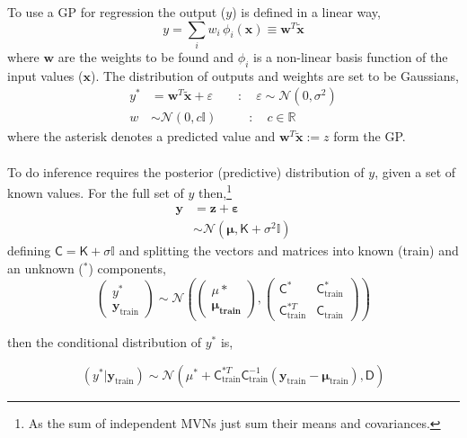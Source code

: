 \documentclass[a4paper,10.5pt]{article}
\begin{document}
To use a GP for regression the output ($y$) is defined in a linear way,
\begin{equation}
	y = \sum_i w_i \,\phi_i(\boldsymbol{x}) \equiv \boldsymbol{w}^T\tilde{\boldsymbol{x}}
\end{equation}
where $\boldsymbol{w}$ are the weights to be found and $\phi_i$ is a non-linear basis function of the input values ($\boldsymbol{x}$). The distribution of outputs and weights are set to be Gaussians,
\begin{equation}
	\begin{aligned}
		y^* &= \boldsymbol{w}^T\tilde{\boldsymbol{x}} + \varepsilon \qquad : \quad
		\varepsilon \sim \mathcal{N}(0, \sigma^2)\\
		w &\sim \mathcal{N}(0, c\mathbb{I})  \qquad\;\; : \quad c \in \mathbb{R}
	\end{aligned}	
\end{equation}
where the asterisk denotes a predicted value and $\boldsymbol{w}^T\tilde{\boldsymbol{x}} := z$ form the GP. 
\\\\
To do inference requires the posterior (predictive) distribution of $y$, given a set of known values. For the full set of $y$ then,\footnote{As the sum of independent MVNs just sum their means and covariances.}
\begin{equation}
	\begin{aligned}
		\boldsymbol{y} &= \boldsymbol{z} + \boldsymbol{\varepsilon} \\
		&\sim \mathcal{N}(\boldsymbol{\mu}, \mathsf{K} + \sigma^2\mathbb{I})
	\end{aligned}
\end{equation} 
defining $\mathsf{C} = \mathsf{K} + \sigma\mathbb{I}$ and splitting the vectors and matrices into known (train) and an unknown (${}^*$) components,
\begin{equation}
	\begin{pmatrix}
		y^*\\
		\boldsymbol{y}_\text{train}
	\end{pmatrix}
	\sim \mathcal{N}\left(
		\begin{pmatrix}
			\mu*\\
			\boldsymbol{\mu_\text{train}}
		\end{pmatrix}
	,
	\begin{pmatrix}
		\mathsf{C}^* & \mathsf{C}^*_\text{train} \\
		\mathsf{C}^{* T}_\text{train} & \mathsf{C}_\text{train}
	\end{pmatrix}
	\right)
\end{equation}

then the conditional distribution of $y^*$ is,

\begin{equation}
	(y^* | \boldsymbol{y}_\text{train}) \sim \mathcal{N}(\mu^* +  \mathsf{C}^{* T}_\text{train}\mathsf{C}_\text{train}^{-1}(\boldsymbol{y}_\text{train} - \boldsymbol{\mu}_\text{train})
	, \mathsf{D})
\end{equation}
\end{document}
